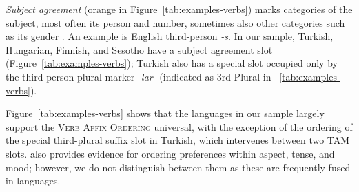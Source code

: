 \documentclass[man]{apa7}
\newcommand{\citep}{\parencite}
\newcommand{\citet}{\Textcite}
\begin{document}
\textit{Subject agreement} (orange in Figure~\ref{tab:examples-verbs}) marks categories of the subject, most often its person and number, sometimes also other categories such as its gender \citep{corbett2003agreement}.
An example is English third-person \textit{-s}.
In our sample, Turkish, Hungarian, Finnish, and Sesotho have a subject agreement slot (Figure~\ref{tab:examples-verbs}); Turkish also has a special slot occupied only by the third-person plural marker \textit{-lar-} (indicated as 3rd Plural in ~\ref{tab:examples-verbs}).



Figure~\ref{tab:examples-verbs} shows that the languages in our sample largely support the \textsc{Verb Affix Ordering} universal, with the exception of the ordering of the special third-plural suffix slot in Turkish, which intervenes between two TAM slots.
\citet{bybee-morphology-1985} also provides evidence for ordering preferences within aspect, tense, and mood; however, we do not distinguish between them as these are frequently fused in languages.
\end{document}
